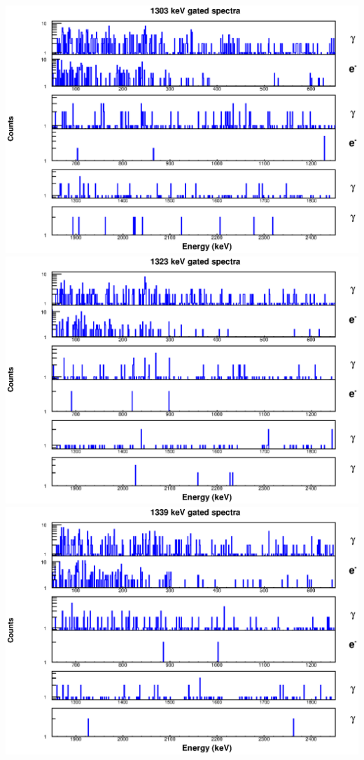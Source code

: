 \includegraphics[scale=0.8]{154Gd_Appendix/1303_combined.eps}
\includegraphics[scale=0.8]{154Gd_Appendix/1323_combined.eps}
\includegraphics[scale=0.8]{154Gd_Appendix/1339_combined.eps}
